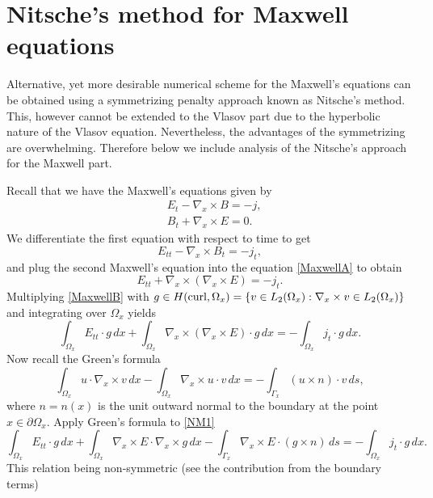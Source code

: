 \documentclass[reqno,a4paper]{amsart}
\theoremstyle{remark}
\numberwithin{equation}{section}
\def\curl{\nabla_x \times }
\def\gradx{\nabla_x}
\begin{document}
\section{Nitsche's method for Maxwell equations}

Alternative, yet more desirable numerical scheme for
the Maxwell's equations can be obtained using a symmetrizing
penalty approach known as Nitsche's method.
This, however cannot be extended to the Vlasov part due 
to the hyperbolic nature of the Vlasov equation.
Nevertheless, the advantages of the symmetrizing are
overwhelming.
Therefore below we include analysis of the Nitsche's 
approach for the Maxwell part.

Recall that we have the Maxwell's equations given by
\begin{equation*} %
\begin{aligned}
& E_{t} - \nabla_x \times B = - j, \\
& B_{t} + \nabla_x \times E = 0.
\end{aligned}
\end{equation*}
We differentiate the first equation with respect to time to get
\begin{equation}\label{MaxwellA}
E_{tt} - \nabla_x \times B_t = -j_t,
\end{equation}
and plug the second Maxwell's equation into the equation \eqref{MaxwellA} 
to obtain 
\begin{equation}\label{MaxwellB}
E_{tt} + \nabla_x \times (\nabla_x \times E ) = -j_t.
\end{equation}
Multiplying \eqref{MaxwellB} with 
$ g \in H(\textnormal{curl}, \Omega_x) = 
\{ v \in L_2(\Omega_x): \curl v \in L_2(\Omega_x ) \} $
and integrating over $ \Omega_x $ yields 
\begin{equation} \label{NM1}
\int_{\Omega_x} E_{tt} \cdot g \, dx +
\int_{\Omega_x} \gradx \times 
(\gradx \times E) \cdot g \, dx = -\int_{\Omega_x} j_t \cdot g \, dx.
\end{equation}
Now recall the Green's formula
\[
\int_{\Omega_x} u \cdot \curl v \, dx - 
\int_{\Omega_x} \curl u \cdot v \, dx = 
- \int_{\Gamma_x} (u \times n) \cdot v \, ds,
\]
where $ n=n(x) $ is the unit outward normal to the boundary at the point 
$x\in \partial\Omega_x$. 
Apply Green's formula to \eqref{NM1}
\[
\int_{\Omega_x} E_{tt} \cdot g \, dx + 
\int_{\Omega_x} \curl E \cdot \curl g \, dx
- \int_{\Gamma_x} \curl E \cdot (g \times n) \, ds = 
-\int_{\Omega_x} j_t \cdot g \, dx.
\]
This relation being non-symmetric 
(see the contribution from the boundary terms) 
\end{document}

